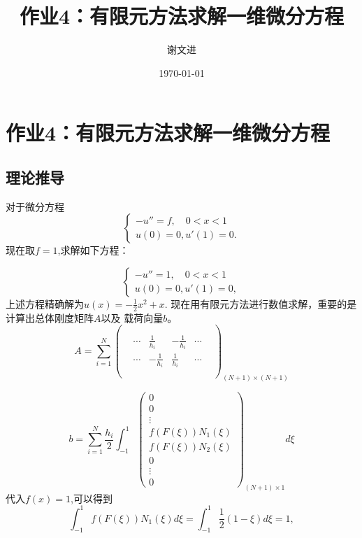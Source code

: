 \documentclass{ctexart}
\title{作业4：有限元方法求解一维微分方程}
\author{谢文进}
\date{\today}
\begin{document}
\maketitle
\section{作业4：有限元方法求解一维微分方程}
\subsection{理论推导}
对于微分方程
$$
    \left\{\begin{matrix}
        -u''=f, \quad  0<x<1 \\ 
        u(0)=0,u'(1)=0.
    \end{matrix}\right.
$$
现在取$f=1$,求解如下方程：

$$
    \left\{\begin{matrix}
        -u''=1, \quad  0<x<1 \\ 
        u(0)=0,u'(1)=0,
    \end{matrix}\right.
$$
上述方程精确解为$u(x)=-\frac{1}{2}x^2+x$.
现在用有限元方法进行数值求解，重要的是计算出总体刚度矩阵$A$以及
载荷向量$b$。
$$
A=
\sum_{i=1}^{N} \begin{pmatrix}
  &  &  &  &  & \\
  &  &  &  &  & \\
  & \cdots & \frac{1}{h_i}  & -\frac{1}{h_i} & \cdots & \\
  & \cdots &  -\frac{1}{h_i}& \frac{1}{h_i} & \cdots & \\
  &  &    &   &  & \\
  &  &  &  &  &
\end{pmatrix}_{(N+1)\times (N+1)}
$$

$$
b=\sum_{i=1}^{N}\frac{h_i}{2}\int_{-1}^{1} \begin{pmatrix}
  0\\
  0\\
  \vdots\\
  f(F(\xi ))N_1(\xi )\\
  f(F(\xi ))N_2(\xi )\\
  0\\
  \vdots \\
 0
 \end{pmatrix}_{(N+1)\times 1} d\xi 
$$
代入$f(x)=1$,可以得到
$$
\int_{-1}^{1} f(F(\xi))N_1(\xi)d\xi=\int_{-1}^{1}\frac{1}{2}(1-\xi)d\xi = 1,
$$
\end{document}
